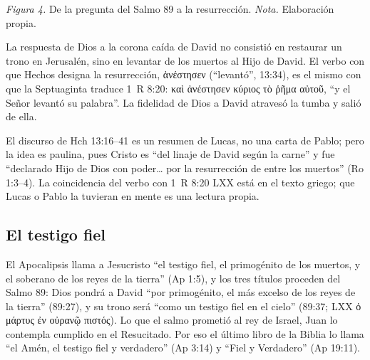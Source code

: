\documentclass[11pt,letterpaper]{article}
\newcommand{\heb}[1]{\mbox{\foreignlanguage{hebrew}{#1}}}
\newcommand{\grc}[1]{\foreignlanguage{ancientgreek}{#1}}
\begin{document}
\begin{center}
\par
{\footnotesize\color{gris}\textit{Figura 4.} De la pregunta del Salmo 89 a la resurrección. \textit{Nota.} Elaboración propia.}
\end{center}

La respuesta de Dios a la corona caída de David no consistió en restaurar un trono en Jerusalén, sino en levantar de los muertos al Hijo de David. El verbo con que Hechos designa la resurrección, \grc{ἀνέστησεν} (``levantó'', 13:34), es el mismo con que la Septuaginta traduce 1~R 8:20: \grc{καὶ ἀνέστησεν κύριος τὸ ῥῆμα αὐτοῦ}, ``y el Señor levantó su palabra''. La fidelidad de Dios a David atravesó la tumba y salió de ella.

\begin{nota}[Precisión]
El discurso de Hch 13:16--41 es un resumen de Lucas, no una carta de Pablo; pero la idea es paulina, pues Cristo es ``del linaje de David según la carne'' y fue ``declarado Hijo de Dios con poder\ldots{} por la resurrección de entre los muertos'' (Ro 1:3--4). La coincidencia del verbo con 1~R 8:20 LXX está en el texto griego; que Lucas o Pablo la tuvieran en mente es una lectura propia.
\end{nota}

\subsection{El testigo fiel}
El Apocalipsis llama a Jesucristo ``el testigo fiel, el primogénito de los muertos, y el soberano de los reyes de la tierra'' (Ap 1:5), y los tres títulos proceden del Salmo 89: Dios pondrá a David ``por primogénito, el más excelso de los reyes de la tierra'' (89:27), y su trono será ``como un testigo fiel en el cielo'' (89:37; LXX \grc{ὁ μάρτυς ἐν οὐρανῷ πιστός}). Lo que el salmo prometió al rey de Israel, Juan lo contempla cumplido en el Resucitado. Por eso el último libro de la Biblia lo llama ``el Amén, el testigo fiel y verdadero'' (Ap 3:14) y ``Fiel y Verdadero'' (Ap 19:11).
\end{document}

